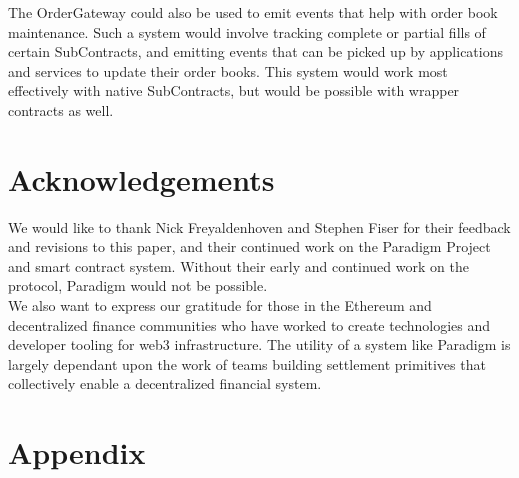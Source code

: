 \documentclass[9pt]{article}
\begin{document}
\noindent The OrderGateway could also be used to emit events that help with order book maintenance. Such a system would involve tracking complete or partial fills of certain SubContracts, and emitting events that can be picked up by applications and services to update their order books. This system would work most effectively with native SubContracts, but would be possible with wrapper contracts as well.

\clearpage
\pagebreak


\section{Acknowledgements}\label{acknowledgements}
\noindent We would like to thank Nick Freyaldenhoven and Stephen Fiser for their feedback and revisions to this paper, and their continued work on the Paradigm Project and smart contract system. Without their early and continued work on the protocol, Paradigm would not be possible. \\ 

\noindent We also want to express our gratitude for those in the Ethereum and decentralized finance communities who have worked to create technologies and developer tooling for web3 infrastructure. The utility of a system like Paradigm is largely dependant upon the work of teams building settlement primitives that collectively enable a decentralized financial system.

\clearpage
\pagebreak


\section{Appendix}\label{appendix}
\end{document}
